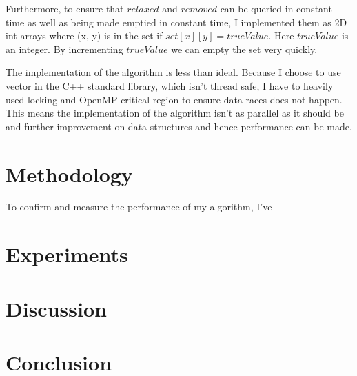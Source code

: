 \documentclass{article}
\begin{document}
Furthermore, to ensure that $relaxed$ and $removed$ can be queried in constant time as well as being
made emptied in constant time, I implemented them as 2D int arrays where (x, y) is in the set if
$set[x][y] = trueValue$. Here $trueValue$ is an integer. By incrementing $trueValue$ we can empty
the set very quickly.

The implementation of the algorithm is less than ideal. Because I choose to use vector in the C++
standard library, which isn't thread safe, I have to heavily used locking and OpenMP critical
region to ensure data races does not happen. This means the implementation of the algorithm isn't as
parallel as it should be and further improvement on data structures and hence performance can be
made.

\section*{Methodology}
To confirm and measure the performance of my algorithm, I've 

\section*{Experiments}
\section*{Discussion}
\section*{Conclusion}

\printbibliography
\end{document}
